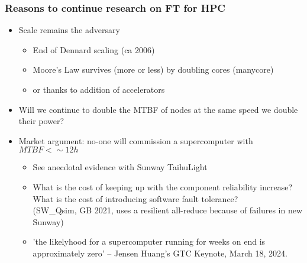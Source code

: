\begin{frame}
  \frametitle{Reasons to continue research on FT for HPC}

  \begin{itemize}
  \item Scale remains the adversary
    \begin{itemize}
    \item End of Dennard scaling (ca 2006)
    \item Moore's Law survives (more or less) by doubling cores (manycore)
    \item or thanks to addition of accelerators
    \end{itemize}
  \item \quesley Will we continue to double the MTBF of nodes at the same speed we double their power?
  \item \quesley Market argument: no-one will commission a supercomputer with $MTBF < \sim 12h$
    \begin{itemize}
    \item \frownie See anecdotal evidence with Sunway TaihuLight
    \item \smiley What is the cost of keeping up with the component reliability increase?\\
      What is the cost of introducing software fault tolerance?\\
      (SW\_Qsim, GB 2021, uses a resilient all-reduce because of failures in new Sunway)
    \item \smiley 'the likelyhood for a supercomputer running for weeks on end is approximately zero' -- Jensen Huang's GTC Keynote, March 18, 2024.
    \end{itemize}
  \end{itemize}
\end{frame}

